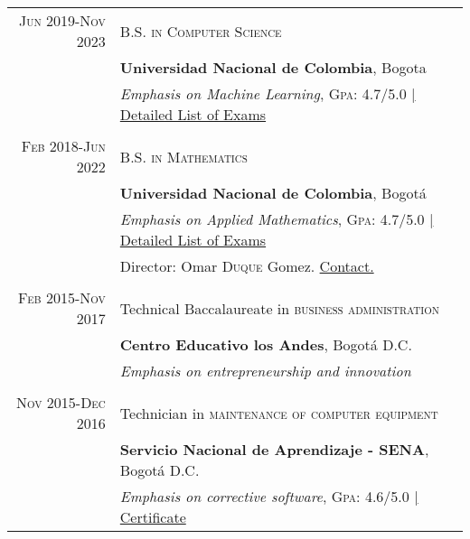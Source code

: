 \documentclass[a4paper,10pt]{article} %
\begin{document}
\begin{tabular}{r|l}	
\textsc{Jun} 2019-\textsc{Nov} 2023 & \textsc{B.S. in Computer Science}\\
& \normalsize\textbf{Universidad Nacional de Colombia}, Bogota\\
& \small\emph{Emphasis on Machine Learning}, \textsc{Gpa}: 4.7/5.0 \href{https://drive.google.com/file/d/1bp6QKeEqpOeCBIBKsst0IwQpr48nmjoi/view?usp=sharing}{\hfill| \footnotesize Detailed List of Exams}\\
&\\


\textsc{Feb} 2018-\textsc{Jun} 2022& \textsc{B.S. in Mathematics}\\
& \normalsize\textbf{Universidad Nacional de Colombia}, Bogotá\\
& \small\emph{Emphasis on Applied Mathematics}, \textsc{Gpa}: 4.7/5.0 \href{https://drive.google.com/file/d/1RW4Q3Kca8rfMUJpejdwlmtTTiA5YgYwU/view?usp=sharing}{\hfill| \footnotesize Detailed List of Exams} \\
& \small Director: Omar \textsc{Duque} Gomez. \href{mailto:oduqueg@unal.edu.co}{Contact.} \\
&\\


\textsc{Feb} 2015-\textsc{Nov} 2017& Technical Baccalaureate in \textsc{business administration}\\
& \normalsize\textbf{Centro Educativo los Andes}, Bogotá D.C. \\
& \small\emph{Emphasis on entrepreneurship and innovation}\\
&\\


\textsc{Nov} 2015-\textsc{Dec} 2016& Technician in \textsc{maintenance of computer equipment}\\
& \normalsize\textbf{Servicio Nacional de Aprendizaje - SENA}, Bogotá D.C.\\
& \small\emph{Emphasis on corrective software}, \textsc{Gpa}: 4.6/5.0 \href{https://drive.google.com/file/d/1beMFGTbBiNhCdUMJnjLYQfCetz7V3xCW/view}{\hfill| \footnotesize Certificate}\\

\end{tabular}
\end{document}
